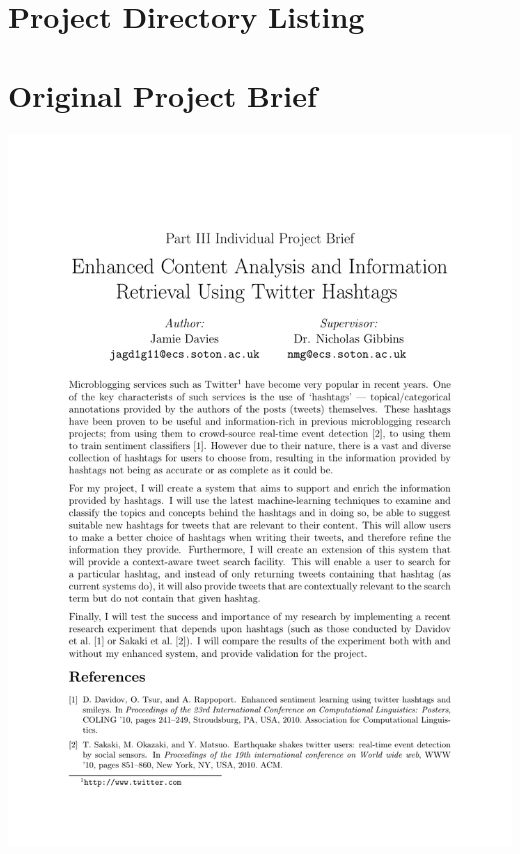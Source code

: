 \documentclass[11pt,a4paper]{report}
\begin{document}
\begin{subappendices}
\section{Project Directory Listing}
\label{appendix:directorytree}
\pagebreak

\section{Original Project Brief}
\begin{center}\includegraphics[trim=2.5cm 2.5cm 2.5cm 3.5cm,clip,width=\textwidth]{../brief/brief.pdf}\end{center}
\end{subappendices}
\end{document}

